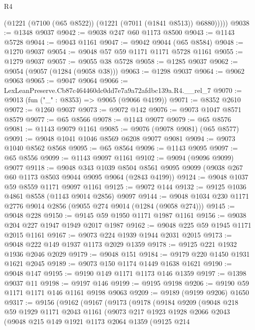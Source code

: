 \begin{lexlean}{R4}
\begin{coremodule}
          (@1221 (@7100 (@65 @8522)) (@1221 (@7011 (@1841 @8513)) @6880)))))
@9038 := @1348 @9037
@9042 := @9038 @247 @60 @1173 @8500
@9043 := @1143 @5728
@9044 := @9043 @1161
@9047 := @9042 @9044 (@65 @8584)
@9048 := @1270 @9037
@9054 := @9048 @57 @59 @1171 @1171 @5728 @1161
@9055 := @1279 @9037
@9057 := @9055 @38 @5728
@9058 := @1285 @9037
@9062 := @9054 (@9057 (@1284 (@9058 @38)))
@9063 := @1298 @9037
@9064 := @9062 @9063
@9065 := @9047 @9064
@9066 := LexLeanPreserve.Cb87c464460dc0dd7e7a9a72afdbc139a.R4.__rel_7
@9070 := @9013 (fun ("_" : @8353) => @9065 (@9066 @4199))
@9071 := @8352 @2610
@9072 := @1260 @9037
@9073 := @9072 @142
@9076 := @9073 @1047 @8571 @8579
@9077 := @65 @8566
@9078 := @1143 @9077
@9079 := @65 @8576
@9081 := @1143 @9079 @1161
@9085 := @9076 (@9078 @9081) (@65 @8577)
@9091 := @9048 @1041 @1046 @8569 @6208 @9077 @9081
@9094 := @9073 @1040 @8562 @8568
@9095 := @65 @8564
@9096 := @1143 @9095
@9097 := @65 @8556
@9099 := @1143 @9097 @1161
@9102 := @9094 (@9096 @9099) @9077
@9118 := @9048
    @343
    @1039
    @8504
    @8561
    @9095
    @9099
    (@9038 @267 @60 @1173 @8503 @9044 @9095 @9064 (@2843 @4199))
@9124 := @9048 @1037 @59 @8559 @1171 @9097 @1161
@9125 := @9072 @144
@9132 := @9125 @1036 @4861 @8558 (@1143 @9014 @2856) @9097
@9144 := @9048 @1034 @230 @1171 @2776 @9014 @2856 (@9055 @274 @9014 (@1284 (@9058 @274)))
@9145 := @9048 @228
@9150 := @9145 @59 @1950 @1171 @1987 @1161
@9156 := @9038 @204 @227 @1947 @1949 @2017 @1987
@9162 := @9048 @225 @59 @1945 @1171 @2015 @1161
@9167 := @9073 @224 @1939 @1944 @2031 @2015
@9173 := @9048 @222 @149 @1937 @1173 @2029 @1359
@9178 := @9125 @221 @1932 @1936 @2046 @2029
@9179 := @9048 @151
@9184 := @9179 @220 @1450 @1931 @1621 @2045
@9189 := @9073 @150 @1174 @1449 @1638 @1621
@9190 := @9048 @147
@9195 := @9190 @149 @1171 @1173 @146 @1359
@9197 := @1398 @9037 @11
@9198 := @9197 @146
@9199 := @9195 @9198
@9206 := @9190 @59 @1171 @1171 @146 @1161 @9198 @9063
@9209 := @9189 (@9199 @9206) @1650
@9317 := @9156
    (@9162
      (@9167
        (@9173
          (@9178
            (@9184
              @9209
              (@9048
                @218
                @59
                @1929
                @1171
                @2043
                @1161
                (@9073
                  @217
                  @1923
                  @1928
                  @2066
                  @2043
                  (@9048
                    @215
                    @149
                    @1921
                    @1173
                    @2064
                    @1359
                    (@9125
                      @214

\end{coremodule}
\end{lexlean}
